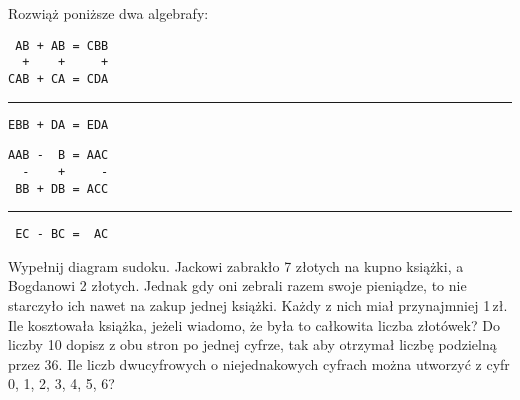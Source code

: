 \documentclass[a4paper,12pt]{article}
\newcounter{liczba}
\newcommand\<
      {%
        \raise 0.2ex\hbox{%
                          $< \kern-1.85ex \raise 0.09ex\hbox{$\scriptstyle )$}$%
                         }\kern 0.6ex
      }
\begin{document}
Rozwiąż poniższe dwa algebrafy:\\[2mm]
\hspace*{10mm}
\begin{minipage}{51mm}
\LARGE
\begin{verbatim}
 AB + AB = CBB
  +    +     +
CAB + CA = CDA
\end{verbatim}
\hrule\vspace{-2mm}
\begin{verbatim}
EBB + DA = EDA
\end{verbatim}
\end{minipage}
\hspace{15mm}
\begin{minipage}{52mm}
\LARGE
\begin{verbatim}
AAB -  B = AAC
  -    +     -
 BB + DB = ACC
\end{verbatim}
\hrule\vspace{-2mm}
\begin{verbatim}
 EC - BC =  AC
\end{verbatim}
\end{minipage}




\hspace*{-1mm}
\begin{minipage}{97mm}
  \begin{lpsudoku}
\end{lpsudoku}
\end{minipage}
\hspace{2mm}
\begin{minipage}{68mm}
Wypełnij diagram sudoku.
\vspace*{2mm}
 Jackowi zabrakło 7 złotych na kupno książki, a Bogdanowi 2 złotych. Jednak gdy oni zebrali razem
      swoje pieniądze, to nie starczyło ich nawet na zakup jednej książki.  Każdy z nich miał przynajmniej
       1\,zł. Ile kosztowała książka, jeżeli    wiadomo, że była to całkowita liczba złotówek?
\vspace{2mm}
Do liczby 10 dopisz z obu stron po jednej cyfrze, tak aby otrzymał liczbę  podzielną przez 36.
\vspace{2mm}
Ile liczb dwucyfrowych o niejednakowych cyfrach można utworzyć z  cyfr 0, 1, 2, 3, 4, 5, 6?
\end{minipage}\\[3mm]
\end{document}

